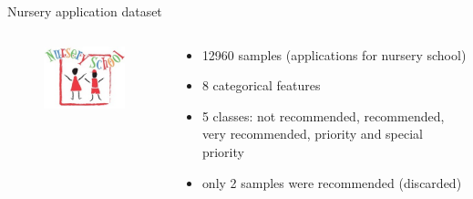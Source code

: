 \documentclass[english]{beamer}
\begin{document}
\begin{frame}{Nursery application dataset}
	\begin{columns}
		\begin{column}{0.35\textwidth}
			\begin{figure}
				\centering
				\includegraphics[scale=0.75]{figures/nursery.jpg}
			\end{figure}
		\end{column}
		
		\begin{column}{0.65\textwidth}
			\begin{itemize}
				\item 12960 samples (applications for nursery school)
				\item 8 categorical features
				\item 5 classes: not recommended, recommended, very recommended, priority and special priority
				\item only 2 samples were recommended (discarded)
			\end{itemize}
		\end{column}
	\end{columns}
\end{frame}
\end{document}
